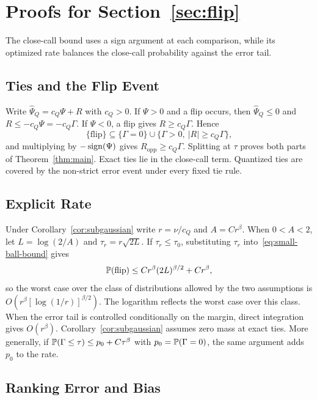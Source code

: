 \section{Proofs for Section~\ref{sec:flip}}
\label{app:p1}

The close-call bound uses a sign argument at each comparison, while its optimized rate balances the close-call probability against the error tail.

\subsection{Ties and the Flip Event}

Write $\widehat\Psi_Q=c_Q\Psi+R$ with $c_Q>0$. If $\Psi>0$ and a flip occurs, then $\widehat\Psi_Q\le0$ and
$R\le-c_Q\Psi=-c_Q\Gamma$.
If $\Psi<0$, a flip gives $R\ge c_Q\Gamma$. Hence
\begin{equation}
\{\text{flip}\}\subseteq\{\Gamma=0\}\cup\{\Gamma>0,\ |R|\ge c_Q\Gamma\},
\label{eq:app-p1-inclusion}
\end{equation}
and multiplying by $-\operatorname{sign}(\Psi)$ gives $R_{\mathrm{opp}}\ge c_Q\Gamma$. Splitting at $\tau$ proves both parts of Theorem~\ref{thm:main}. Exact ties lie in the close-call term. Quantized ties are covered by the non-strict error event under every fixed tie rule.

\subsection{Explicit Rate}

Under Corollary~\ref{cor:subgaussian} write $r=\nu/c_Q$ and $A=Cr^\beta$. When $0<A<2$, let $L=\log(2/A)$ and $\tau_r=r\sqrt{2L}$. If $\tau_r\le\tau_0$, substituting $\tau_r$ into~\eqref{eq:small-ball-bound} gives
\begin{equation}
\mathbb{P}(\text{flip})\le Cr^\beta(2L)^{\beta/2}+Cr^\beta,
\label{eq:app-p1-rate}
\end{equation}
so the worst case over the class of distributions allowed by the two assumptions is
$O\!\left(r^\beta[\log(1/r)]^{\beta/2}\right)$.
The logarithm reflects the worst case over this class. When the error tail is controlled conditionally on the margin, direct integration gives $O(r^\beta)$. Corollary~\ref{cor:subgaussian} assumes zero mass at exact ties. More generally, if $\mathbb{P}(\Gamma\le\tau)\le p_0+C\tau^\beta$ with $p_0=\mathbb{P}(\Gamma=0)$, the same argument adds $p_0$ to the rate.

\subsection{Ranking Error and Bias}
\label{app:ranking-proof}

